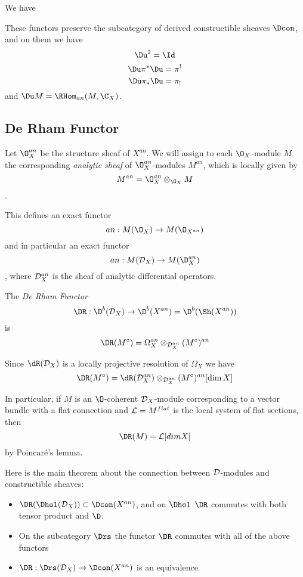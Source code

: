 \documentclass[etingof-dmod.tex]{subfiles}
\begin{document}

We have
\begin{thm}These functors preserve the subcategory of derived constructible
  sheaves $\Dcon$, and on them we have
    $$\Du^2 = \Id$$
    $$\Du \pi^* \Du = \pi^!$$
    $$\Du \pi_* \Du = \pi_!$$
    and $\Du M = \RHom_{an}(M, \C_X)$.
\end{thm}

\subsection{De Rham Functor}
Let $\O_X^{an}$ be the structure sheaf of $X^{an}$. We will assign to each
$\O_X$-module $M$ the corresponding \textit{analytic sheaf} of
$\O_X^{an}$-modules $M^{an}$, which is locally given by
$$M^{an} = \O_{X}^{an} \otimes_{\O_X}M$$.

This defines an exact functor $$an : M(\O_X) \rightarrow
M(\O_{X^{an}})$$ and in particular an exact functor $$an: M(\mc{D}_X)
\rightarrow M(\D_X^{an})$$, where $\mathcal{D}_X^{an}$ is the sheaf of analytic
differential operators.

\begin{defn}
  The \textit{De Rham Functor}
  $$\DR: \D^b(\mc{D}_X) \rightarrow \D^b(X^{an}) = \D^b(\Sh(X^{an}))$$
  is $$\DR(M^{\circ}) = \Omega_X^{an} \otimes_{\mc{D}_X^{an}}
  (M^{\circ})^{an}$$
\end{defn}

\begin{rmk}
  Since $\dR(\mc{D}_X)$ is a locally projective resolution of $\Omega_X$ we have
  $$\DR(M^{\circ}) = \dR(\mc{D}_X^{an}) \otimes_{\mc{D}_X^{an}}
  (M^{\circ})^{an}[\dim X]$$
\end{rmk}

In particular, if $M$ is an $\O$-coherent $\mathcal{D}_X$-module corresponding to a vector
bundle with a flat connection and $\mathcal{L} = M^{flat}$ is the local system  of
flat sections, then $$\DR(M) = \mc{L}[dim X]$$ by Poincar\'e's lemma.

Here is the main theorem about the connection between $\mathcal{D}$-modules and
constructible sheaves:

\begin{thm}
  \begin{itemize}
    \item $\DR(\Dhol(\mc{D}_X)) \subset \Dcon(X^{an})$, and on $\Dhol$ $\DR$
      commutes with both tensor product and $\D$.
    \item On the subcategory $\Drs$ the functor $\DR$ commutes with all of the
      above functors
    \item $\DR: \Drs(\mc{D}_X) \rightarrow \Dcon(X^{an})$ is an equivalence.
  \end{itemize}
\end{thm}
\end{document}
